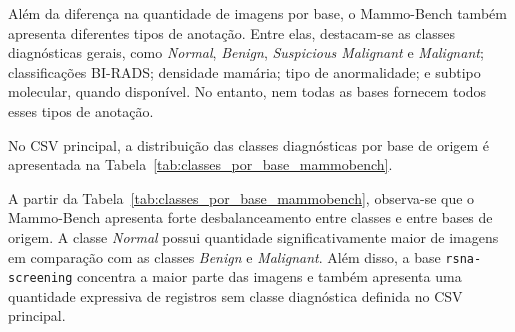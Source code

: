 \documentclass[
    12pt,
    openright,
    oneside,
    a4paper,
    english,
    brazil
]{abntex2}
\begin{document}
Além da diferença na quantidade de imagens por base, o Mammo-Bench também apresenta diferentes tipos de anotação. Entre elas, destacam-se as classes diagnósticas gerais, como \textit{Normal}, \textit{Benign}, \textit{Suspicious Malignant} e \textit{Malignant}; classificações BI-RADS; densidade mamária; tipo de anormalidade; e subtipo molecular, quando disponível. No entanto, nem todas as bases fornecem todos esses tipos de anotação.

No CSV principal, a distribuição das classes diagnósticas por base de origem é apresentada na Tabela~\ref{tab:classes_por_base_mammobench}.


\begin{table}[H]
\centering
\caption{Distribuição das classes por base de origem no CSV principal do Mammo-Bench}
\label{tab:classes_por_base_mammobench}
\end{table}

A partir da Tabela~\ref{tab:classes_por_base_mammobench}, observa-se que o Mammo-Bench apresenta forte desbalanceamento entre classes e entre bases de origem. A classe \textit{Normal} possui quantidade significativamente maior de imagens em comparação com as classes \textit{Benign} e \textit{Malignant}. Além disso, a base \texttt{rsna-screening} concentra a maior parte das imagens e também apresenta uma quantidade expressiva de registros sem classe diagnóstica definida no CSV principal.
\end{document}
